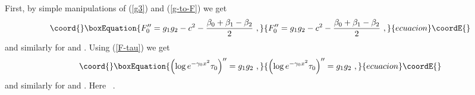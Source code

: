 \documentclass[a4paper,11pt]{article}
\begin{document}
First, by simple manipulations of (\ref{g3}) and (\ref{g-to-F}) we get
\begin{equation}\coord{}\boxEquation{
\label{F0} F_0'' = g_1 g_2 - c^2 - \frac{\beta_0 + \beta_1 - \beta_2}{2}~,
}{
F_0'' = g_1 g_2 - c^2 - \frac{\beta_0 + \beta_1 - \beta_2}{2}~,
}{ecuacion}\coordE{}\end{equation}
and similarly for \coordHE{} and \coordHE{}. Using (\ref{F-tau}) we get
\begin{equation}\coord{}\boxEquation{
\label{log-tau}
\left( \log e^{-\gamma_0 x^2} \tau_0 \right)'' = g_1 g_2~,
}{
\left( \log e^{-\gamma_0 x^2} \tau_0 \right)'' = g_1 g_2~,
}{ecuacion}\coordE{}\end{equation}
and similarly for \coordHE{} and \coordHE{}. Here
\coordHE{}~.
\end{document}
